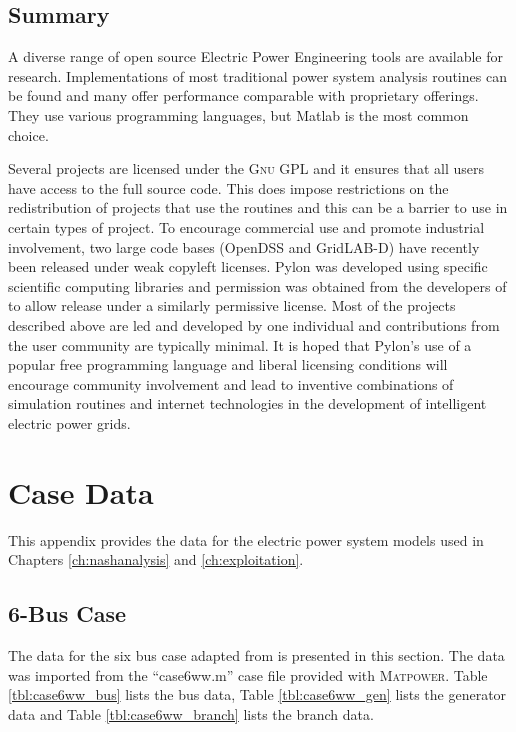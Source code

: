 \section{Summary}
A diverse range of open source Electric Power Engineering tools are available
for research.  Implementations of most traditional power system
analysis routines can be found and many offer performance comparable with
proprietary offerings.  They use various programming languages, but Matlab is
the most common choice.

Several projects are licensed under the \textsc{Gnu} GPL and it ensures that all
users have access to the full source code.  This does impose restrictions on the
redistribution of projects that use the routines and this can be a barrier to
use in certain types of project.  To encourage commercial use and promote
industrial involvement, two large code bases (OpenDSS and GridLAB-D) have
recently been released under weak copyleft licenses.  Pylon was developed using
specific scientific computing libraries and permission was obtained from the
developers of \matpower to allow release under a similarly permissive license.
Most of the projects described above are led and developed by one individual
and contributions from the user community are typically minimal.  It is hoped
that Pylon's use of a popular free programming language and liberal licensing
conditions will encourage community involvement and lead to inventive
combinations of simulation routines and internet technologies in the
development of intelligent electric power grids.

\chapter{Case Data}
This appendix provides the data for the electric power system models used in
Chapters \ref{ch:nashanalysis} and \ref{ch:exploitation}.

\section{6-Bus Case}
\label{adx:case6ww}
The data for the six bus case adapted from  is presented in this section.  The data was imported from the
``case6ww.m'' case file provided with \textsc{Matpower}.
Table \ref{tbl:case6ww_bus} lists the bus data, Table \ref{tbl:case6ww_gen}
lists the generator data and Table \ref{tbl:case6ww_branch} lists the branch
data.

